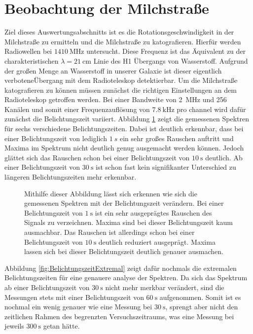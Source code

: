\section{Beobachtung der Milchstraße}
Ziel dieses Auswertungsabschnitts ist es die Rotationsgeschwindigkeit in der Milchstraße zu ermitteln und die Milchstraße zu katografieren.\newline
Hierfür werden Radiowellen bei $\SI{1410}{\mega \hertz}$ untersucht. Diese Frequenz ist das Äquivalent zu der charakteristischen $\lambda = \SI{21}{\centi \metre}$ Linie des H1 Übergangs von Wasserstoff. Aufgrund der großen Menge an Wasserstoff in unserer Galaxie ist dieser eigentlich \dq verbotene\dq  Übergang mit dem Radioteleskop detektierbar.\newline
Um die Milchstraße katografieren zu können müssen zunächst die richtigen Einstellungen an dem Radioteleskop getroffen werden. Bei einer Bandweite von \SI{2}{MHz} und 256 Kanälen und somit einer Frequenzauflösung von $\SI{7.8}{\kilo \hertz}$ pro channel \cite{Usermanual} wird dafür zunächst die Belichtungszeit variiert. Abbildung \ref{fig:Belichtungszeit} zeigt die gemessenen Spektren für sechs verschiedene Belichtungszeiten. Dabei ist deutlich erkennbar, dass bei einer Belichtungszeit von lediglich $\SI{1}{s}$ ein sehr großes Rauschen auftritt und Maxima im Spektrum nicht deutlich genug ausgemacht werden können. Jedoch glättet sich das Rauschen schon bei einer Belichtungszeit von $\SI{10}{\second}$ deutlich. Ab einer Belichtungszeit von $\SI{30}{\second}$ ist schon fast kein signifikanter Unterschied zu längeren Belichtungszeiten mehr erkennbar.
\begin{figure}[H]
    \centering
       
    \caption[Gemessenen Spektren bei verschiedenen Belichtungszeiten]{Mithilfe dieser Abbildung lässt sich erkennen wie sich die gemessenen Spektren mit der Belichtungszeit verändern. Bei einer Belichtungszeit von $\SI{1}{\second}$ ist ein sehr ausgeprägtes Rauschen des Signals zu verzeichnen. Maxima sind bei dieser Belichtungszeit kaum ausmachbar. Das Rauschen ist allerdings schon bei einer Belichtungszeit von $\SI{10}{\second}$ deutlich reduziert ausgeprägt. Maxima lassen sich bei dieser Belichtungszeit deutlich genauer ausmachen.}
    \label{fig:Belichtungszeit}
\end{figure}
Abbildung \ref{fig:BelichtungszeitExtremal} zeigt dafür nochmals die extremalen Belichtungszeiten für eine genauere analyse der Spektren. Da sich das Spektrum ab einer Belichtungszeit von $\SI{30}{\second}$ nicht mehr merkbar verändert, sind die Messungen stets mit einer Belichtungszeit von $\SI{60}{\second}$ aufgenommen. Somit ist es nochmal ein wenig genauer wie eine Messung bei $\SI{30}{\second}$, sprengt aber nicht den zeitlichen Rahmen des begrenzten Versuchszeitraums, was eine Messung bei jeweils $\SI{300}{\second}$ getan hätte.
